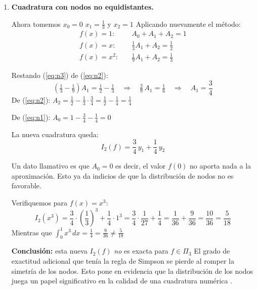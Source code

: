 \documentclass[12pt]{article}
\begin{document}
\begin{enumerate}
\begin{itemize}
		Este grado de exactitud extra es una propiedad particular de la regla de Simpson que se debe a la simetría de los nodos respecto al centro del intervalo \cite{mathworld_simpson}.
	\end{itemize}

	\item \textbf{Cuadratura con nodos no equidistantes.}

	Ahora tomemos $x_0=0$ $x_1=\tfrac{1}{3}$ y $x_2=1$ Aplicando nuevamente el método:
	\begin{align}
		f(x)=1:   &\quad A_0 + A_1 + A_2 = 1 \label{eq:n1}\\[4pt]
		f(x)=x:   &\quad \tfrac{1}{3}A_1 + A_2 = \tfrac{1}{2} \label{eq:n2}\\[4pt]
		f(x)=x^2: &\quad \tfrac{1}{9}A_1 + A_2 = \tfrac{1}{3} \label{eq:n3}
	\end{align}

	Restando (\ref{eq:n3}) de (\ref{eq:n2}):
	\[
	\left(\tfrac{1}{3} - \tfrac{1}{9}\right)A_1 = \tfrac{1}{2} - \tfrac{1}{3} \quad\Longrightarrow\quad \tfrac{2}{9}\,A_1 = \tfrac{1}{6} \quad\Longrightarrow\quad A_1 = \frac{3}{4}
	\]
	De (\ref{eq:n2}): $A_2 = \tfrac{1}{2} - \tfrac{1}{3}\cdot\tfrac{3}{4} = \tfrac{1}{2} - \tfrac{1}{4} = \tfrac{1}{4}$

	De (\ref{eq:n1}): $A_0 = 1 - \tfrac{3}{4} - \tfrac{1}{4} = 0$

	La nueva cuadratura queda:
	\[
	I_2(f) = \frac{3}{4}\,y_1 + \frac{1}{4}\,y_2
	\]

	Un dato llamativo es que $A_0=0$ es decir, el valor $f(0)$ no aporta nada a la aproximación. Esto ya da indicios de que la distribución de nodos no es favorable.

	Verifiquemos para $f(x) = x^3$:
	\[
	I_2(x^3) = \frac{3}{4}\cdot\left(\frac{1}{3}\right)^3 + \frac{1}{4}\cdot 1^3 = \frac{3}{4}\cdot\frac{1}{27} + \frac{1}{4} = \frac{1}{36} + \frac{9}{36} = \frac{10}{36} = \frac{5}{18}
	\]
	Mientras que $\int_0^1 x^3\,dx = \tfrac{1}{4} = \tfrac{9}{36} \neq \tfrac{5}{18}$

	\textbf{Conclusión:} esta nueva $I_2(f)$ \textit{no} es exacta para $f\in\Pi_3$ El grado de exactitud adicional que tenía la regla de Simpson se pierde al romper la simetría de los nodos. Esto pone en evidencia que la distribución de los nodos juega un papel significativo en la calidad de una cuadratura numérica \cite{chapra07}.
\end{enumerate}


\end{document}
